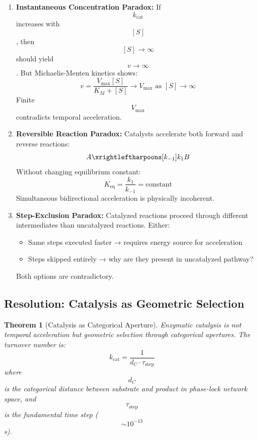 \documentclass[12pt,a4paper]{article}
\newtheorem{theorem}{Theorem}
\begin{document}
\begin{enumerate}
\item \textbf{Instantaneous Concentration Paradox:} If $$k_{\text{cat}}$$ increases with $$[S]$$, then $$[S] \to \infty$$ should yield $$v \to \infty$$. But Michaelis-Menten kinetics shows:
$$
v = \frac{V_{\max} [S]}{K_M + [S]} \to V_{\max} \text{ as } [S] \to \infty
$$
Finite $$V_{\max}$$ contradicts temporal acceleration.

\item \textbf{Reversible Reaction Paradox:} Catalysts accelerate both forward and reverse reactions:
$$
A \xrightleftharpoons[k_{-1}]{k_1} B
$$
Without changing equilibrium constant:
$$
K_{\text{eq}} = \frac{k_1}{k_{-1}} = \text{constant}
$$
Simultaneous bidirectional acceleration is physically incoherent.

\item \textbf{Step-Exclusion Paradox:} Catalyzed reactions proceed through different intermediates than uncatalyzed reactions. Either:
\begin{itemize}
\item Same steps executed faster → requires energy source for acceleration
\item Steps skipped entirely → why are they present in uncatalyzed pathway?
\end{itemize}
Both options are contradictory.
\end{enumerate}

\subsection{Resolution: Catalysis as Geometric Selection}

\begin{theorem}[Catalysis as Categorical Aperture]
Enzymatic catalysis is not temporal acceleration but geometric selection through categorical apertures. The turnover number is:
$$
k_{\text{cat}} = \frac{1}{d_C \cdot \tau_{\text{step}}}
$$
where $$d_C$$ is the categorical distance between substrate and product in phase-lock network space, and $$\tau_{\text{step}}$$ is the fundamental time step ($$\sim 10^{-13}$$ s).
\end{theorem}
\end{document}
